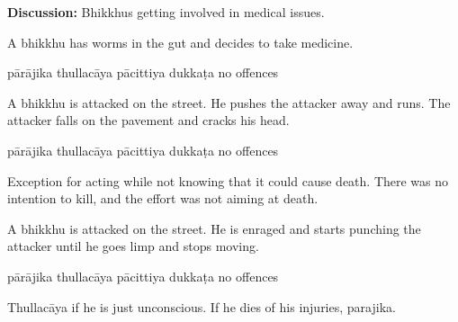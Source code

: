 \begin{exam}{\autoExamName}
\begin{problem*}
\begin{parts}
  \bigskip

  \textbf{Discussion:} Bhikkhus getting involved in medical issues.  

  \bigskip
  
  \item A bhikkhu has worms in the gut and decides to take medicine.

  \bigskip

  \begin{answers}{5}
    \bChoices
     pārājika\eAns
     thullacāya\eAns
     pācittiya\eAns
     dukkaṭa\eAns
     no offences\eAns
    \eChoices
  \end{answers}

  \item A bhikkhu is attacked on the street. He pushes the attacker away and runs. The
  attacker falls on the pavement and cracks his head.

  \bigskip

  \begin{answers}{5}
    \bChoices
     pārājika\eAns
     thullacāya\eAns
     pācittiya\eAns
     dukkaṭa\eAns
     no offences\eAns
    \eChoices
  \end{answers}

  \begin{solution}
    Exception for acting while not knowing that it could cause death. There was
    no intention to kill, and the effort was not aiming at death.
  \end{solution}

  \bigskip

  \item A bhikkhu is attacked on the street. He is enraged and starts punching the attacker
  until he goes limp and stops moving.

  \bigskip

  \begin{answers}{5}
    \bChoices
     pārājika\eAns
     thullacāya\eAns
     pācittiya\eAns
     dukkaṭa\eAns
     no offences\eAns
    \eChoices
  \end{answers}

  \begin{solution}
    Thullacāya if he is just unconscious. If he dies of his injuries, parajika.
  \end{solution}

\end{parts}

\end{problem*}


\end{exam}
